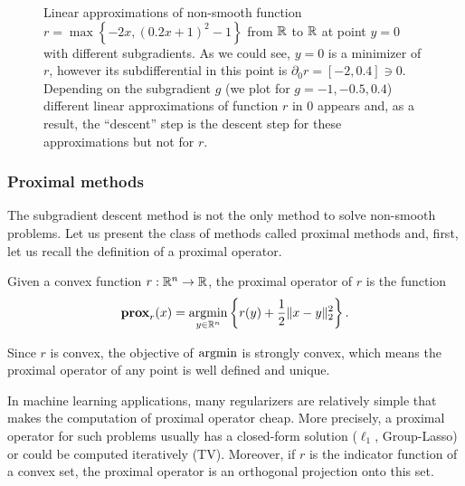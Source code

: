 \begin{figure}[H]
    \centering
    
    \caption{Linear approximations of non-smooth function $r = \max\left\{-2x, (0.2x+1)^2 - 1\right\}$ from $\mathbb{R}$ to $\mathbb{R}$
    at point $y = 0$ with different subgradients. As we could see, $y=0$ is a minimizer of $r$, however its subdifferential in this point is $\partial_0 r = [-2, 0.4]\ni0$. Depending on the subgradient $g$ (we plot for $g=-1, -0.5, 0.4$) different linear approximations of function $r$ in $0$ appears and, as a result, the ``descent'' step is the descent step for these approximations but not for $r$.}
    \label{fig:nonsmooth_approx}
\end{figure}


\subsubsection{Proximal methods}
The subgradient descent method is not the only method to solve non-smooth problems. Let us present the class of methods called proximal methods and, first, let us recall the definition of a proximal operator.

\begin{definition}\label{def:proximal_operator}
Given a convex function $r:\mathbb{R}^n\rightarrow \mathbb{R}$, the proximal operator of $r$ is the function
\begin{equation}\label{eq:prox}
\mathbf{prox}_r(x) = \operatorname*{argmin}_{y\in\mathbb{R}^n}\left\{r(y) + \frac{1}{2}\|x-y\|_2^2\right\}.
\end{equation}
\end{definition}
Since $r$ is convex, the objective of $\operatorname*{argmin}$ is strongly convex, which means the proximal operator of any point is well defined and unique.

In machine learning applications, many regularizers are relatively simple that makes the computation of proximal operator cheap. More precisely, a proximal operator for such problems usually has a closed-form solution ($\ell_1$, Group-Lasso) or could be computed iteratively (TV). Moreover, if $r$ is the indicator function of a convex set, the proximal operator is an orthogonal projection onto this set. 


